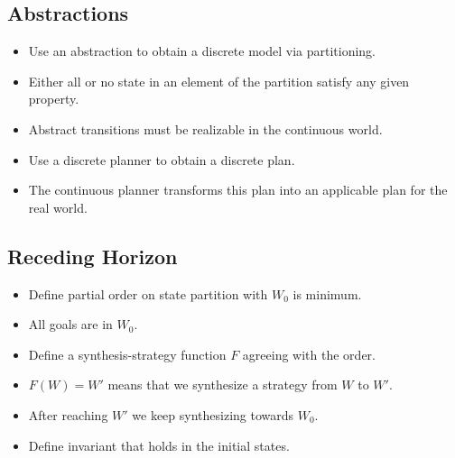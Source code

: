 \subsection{Abstractions}
\begin{itemize}
	\item Use an abstraction to obtain a discrete model via partitioning. 
	\item Either all or no state in an element of the partition satisfy any given property.
	\item Abstract transitions must be realizable in the continuous world.
	\item Use a discrete planner to obtain a discrete plan.
	\item The continuous planner transforms this plan into an applicable plan for the real world.
\end{itemize}

\subsection{Receding Horizon}

\begin{itemize}
	\item Define partial order on state partition with $W_0$ is minimum.
	\item All goals are in $W_0$.
	\item Define a synthesis-strategy function $F$ agreeing with the order. 
	\item $F(W) = W'$ means that we synthesize a strategy from $W$ to $W'$.
	\item After reaching $W'$ we keep synthesizing towards $W_0$.
	\item Define invariant that holds in the initial states.
\end{itemize}


